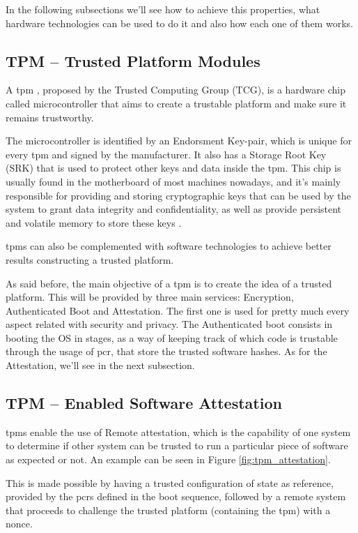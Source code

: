 In the following subsections we'll see how to achieve this properties, what hardware technologies can be used to do it and also how each one of them works.

\subsection{TPM – Trusted Platform Modules }
\label{ssec:tpm_intro}

A \gls{tpm} \cite{tpmPaper}, proposed by the Trusted Computing Group (TCG), is a hardware chip called microcontroller that aims to create a trustable platform and make sure it remains trustworthy.
 
The microcontroller is identified by an Endorsment Key-pair, which is unique for every \gls{tpm} and signed by the manufacturer. It also has a Storage Root Key (SRK) that is used to protect other keys and data inside the \gls{tpm}. 
This chip is usually found in the motherboard of most machines nowadays, and it's mainly responsible for providing and storing cryptographic keys that can be used by the system to grant data integrity and confidentiality, as well as provide persistent and volatile memory to store these keys \cite{sgxCloudThesis}.

\gls{tpm}s can also be complemented with software technologies to achieve better results constructing a trusted platform. 

As said before, the main objective of a \gls{tpm} is to create the idea of a trusted platform. This will be  provided by three main services: Encryption, Authenticated Boot and Attestation. The first one is used for pretty much every aspect related with security and privacy. The Authenticated boot consists in booting the OS in stages, as a way of keeping track of which code is trustable through the usage of \gls{pcr}, that store the trusted software hashes. As for the Attestation, we'll see in the next subsection.


\subsection{TPM – Enabled Software Attestation}
\label{ssec:tpm_attest}

\gls{tpm}s enable the use of Remote attestation, which is the capability of one system to determine if other system can be trusted to run a particular piece of software as expected or not. An example can be seen in Figure \ref{fig:tpm_attestation}.

This is made possible by having a trusted configuration of state as reference, provided by the \gls{pcr}s defined in the boot sequence, followed by a remote system that proceeds to challenge the trusted platform (containing the \gls{tpm}) with a nonce. 

